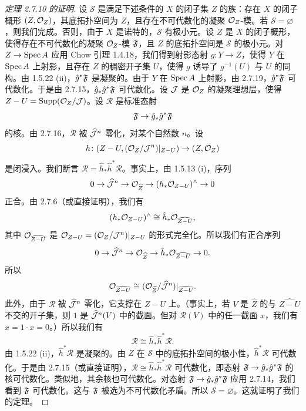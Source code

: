 \begin{proof}[定理 2.7.10 的证明]
设 $\mathcal{S}$ 是满足下述条件的 $X$ 的闭子集 $Z$ 的族：存在 $X$ 的闭子概形 $(Z,\mathcal{O}_Z)$，其底拓扑空间为 $Z$，且存在不可代数化的凝聚 $\mathcal{O}_Z$-模。若 $\mathcal{S}=\varnothing$，则我们完成。否则，由于 $X$ 是诺特的，$\mathcal{S}$ 有极小元。设 $Z$ 是 $X$ 的闭子概形，使得存在不可代数化的凝聚 $\mathcal{O}_Z$-模 $\mathfrak{F}$，且 $Z$ 的底拓扑空间是 $\mathcal{S}$ 的极小元。对 $Z\to\operatorname{Spec} A$ 应用 Chow 引理 1.4.18，我们得到射影态射 $g\colon Y\to Z$，使得 $Y$ 在 $\operatorname{Spec} A$ 上射影，且存在 $Z$ 的稠密开子集 $U$，使得 $g$ 诱导了 $g^{-1}(U)$ 与 $U$ 的同构。由 1.5.22 (ii)，$\hat{g}^*\mathfrak{F}$ 是凝聚的。由于 $Y$ 在 $\operatorname{Spec} A$ 上射影，由 2.7.19，$\hat{g}^*\mathfrak{F}$ 可代数化。于是由 2.7.15，$\hat{g}_*\hat{g}^*\mathfrak{F}$ 可代数化。设 $\mathcal{J}$ 是 $\mathcal{O}_Z$ 的凝聚理想层，使得 $Z-U=\operatorname{Supp}(\mathcal{O}_Z/\mathcal{J})$。设 $\mathcal{R}$ 是标准态射
\begin{equation*}
\mathfrak{F}\to\hat{g}_*\hat{g}^*\mathfrak{F}
\end{equation*}
的核。由 2.7.16，$\mathcal{R}$ 被 $\widehat{\mathcal{J}}^n$ 零化，对某个自然数 $n$。设
\begin{equation*}
h\colon(Z-U,(\mathcal{O}_Z/\mathcal{J}^n)|_{Z-U})\to(Z,\mathcal{O}_Z)
\end{equation*}
是闭浸入。我们断言 $\mathcal{R}=\hat{h}_*\hat{h}^*\mathcal{R}$。事实上，由 1.5.13 (i)，序列
\begin{equation*}
0\to\widehat{\mathcal{J}}^n\to\mathcal{O}_{\widehat{Z}}\to(h_*\mathcal{O}_{Z-U})^{\wedge}\to 0
\end{equation*}
正合。由 2.7.6（或直接证明），我们有
\begin{equation*}
(h_*\mathcal{O}_{Z-U})^{\wedge}\cong\hat{h}_*\mathcal{O}_{\widehat{Z-U}},
\end{equation*}
其中 $\mathcal{O}_{\widehat{Z-U}}$ 是 $\mathcal{O}_{Z-U}=(\mathcal{O}_Z/\mathcal{J}^n)|_{Z-U}$ 的形式完全化。所以我们有正合序列
\begin{equation*}
0\to\widehat{\mathcal{J}}^n\to\mathcal{O}_{\widehat{Z}}\to\hat{h}_*\mathcal{O}_{\widehat{Z-U}}\to 0.
\end{equation*}
所以
\begin{equation*}
\mathcal{O}_{\widehat{Z-U}}\cong(\mathcal{O}_{\widehat{Z}}/\widehat{\mathcal{J}}^n)|_{\widehat{Z-U}}.
\end{equation*}
此外，由于 $\mathcal{R}$ 被 $\widehat{\mathcal{J}}^n$ 零化，它支撑在 $\widehat{Z-U}$ 上。（事实上，若 $V$ 是 $\widehat{Z}$ 的与 $\widehat{Z-U}$ 不交的开子集，则 $1$ 是 $\widehat{\mathcal{J}}^n(V)$ 中的截面。但对 $\mathcal{R}(V)$ 中的任一截面 $x$，我们有 $x=1\cdot x=0$。）所以我们有
\begin{equation*}
\mathcal{R}\cong\hat{h}_*\hat{h}^*\mathcal{R}.
\end{equation*}
由 1.5.22 (ii)，$\hat{h}^*\mathcal{R}$ 是凝聚的。由 $Z$ 在 $\mathcal{S}$ 中的底拓扑空间的极小性，$\hat{h}^*\mathcal{R}$ 可代数化。于是由 2.7.15（或直接证明），$\mathcal{R}\cong\hat{h}_*\hat{h}^*\mathcal{R}$ 可代数化，即态射 $\mathfrak{F}\to\hat{g}_*\hat{g}^*\mathfrak{F}$ 的核可代数化。类似地，其余核也可代数化。对态射 $\mathfrak{F}\to\hat{g}_*\hat{g}^*\mathfrak{F}$ 应用 2.7.14，我们看到 $\mathfrak{F}$ 可代数化。这与 $\mathfrak{F}$ 被选为不可代数化矛盾。所以 $\mathcal{S}=\varnothing$。这就证明了我们的定理。
\end{proof}

